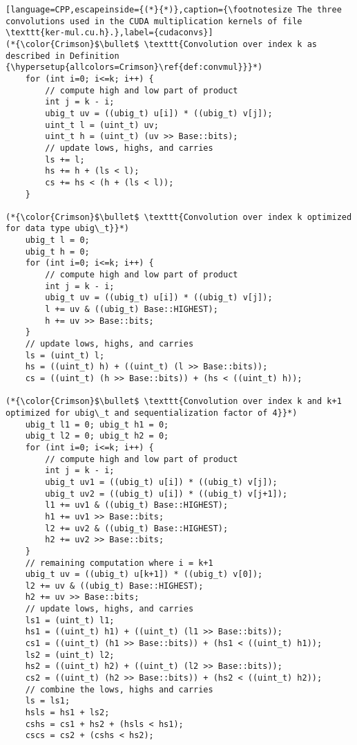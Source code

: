 \begin{lstlisting}[language=CPP,escapeinside={(*}{*)},caption={\footnotesize The three convolutions used in the CUDA multiplication kernels of file \texttt{ker-mul.cu.h}.},label={cudaconvs}]
(*{\color{Crimson}$\bullet$ \texttt{Convolution over index k as described in Definition {\hypersetup{allcolors=Crimson}\ref{def:convmul}}}*)
    for (int i=0; i<=k; i++) {
        // compute high and low part of product
        int j = k - i;
        ubig_t uv = ((ubig_t) u[i]) * ((ubig_t) v[j]);
        uint_t l = (uint_t) uv;
        uint_t h = (uint_t) (uv >> Base::bits);
        // update lows, highs, and carries
        ls += l;
        hs += h + (ls < l);
        cs += hs < (h + (ls < l));
    }

(*{\color{Crimson}$\bullet$ \texttt{Convolution over index k optimized for data type ubig\_t}}*)
    ubig_t l = 0;
    ubig_t h = 0;
    for (int i=0; i<=k; i++) {
        // compute high and low part of product
        int j = k - i;
        ubig_t uv = ((ubig_t) u[i]) * ((ubig_t) v[j]);
        l += uv & ((ubig_t) Base::HIGHEST);
        h += uv >> Base::bits;
    }
    // update lows, highs, and carries
    ls = (uint_t) l;
    hs = ((uint_t) h) + ((uint_t) (l >> Base::bits));
    cs = ((uint_t) (h >> Base::bits)) + (hs < ((uint_t) h));

(*{\color{Crimson}$\bullet$ \texttt{Convolution over index k and k+1 optimized for ubig\_t and sequentialization factor of 4}}*)
    ubig_t l1 = 0; ubig_t h1 = 0;
    ubig_t l2 = 0; ubig_t h2 = 0;
    for (int i=0; i<=k; i++) {
        // compute high and low part of product
        int j = k - i;
        ubig_t uv1 = ((ubig_t) u[i]) * ((ubig_t) v[j]);
        ubig_t uv2 = ((ubig_t) u[i]) * ((ubig_t) v[j+1]);
        l1 += uv1 & ((ubig_t) Base::HIGHEST);
        h1 += uv1 >> Base::bits;
        l2 += uv2 & ((ubig_t) Base::HIGHEST);
        h2 += uv2 >> Base::bits;
    }
    // remaining computation where i = k+1
    ubig_t uv = ((ubig_t) u[k+1]) * ((ubig_t) v[0]);
    l2 += uv & ((ubig_t) Base::HIGHEST);
    h2 += uv >> Base::bits;
    // update lows, highs, and carries
    ls1 = (uint_t) l1;
    hs1 = ((uint_t) h1) + ((uint_t) (l1 >> Base::bits));
    cs1 = ((uint_t) (h1 >> Base::bits)) + (hs1 < ((uint_t) h1));
    ls2 = (uint_t) l2;
    hs2 = ((uint_t) h2) + ((uint_t) (l2 >> Base::bits));
    cs2 = ((uint_t) (h2 >> Base::bits)) + (hs2 < ((uint_t) h2));
    // combine the lows, highs and carries
    ls = ls1;
    hsls = hs1 + ls2;
    cshs = cs1 + hs2 + (hsls < hs1);
    cscs = cs2 + (cshs < hs2);
\end{lstlisting}

